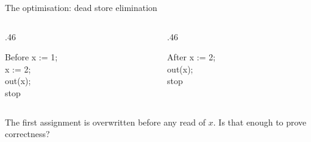 \documentclass[handout,aspectratio=169,11pt]{beamer}
\newcommand{\Takeaway}[1]{\begin{exampleblock}{}#1\end{exampleblock}}
\begin{document}
\begin{frame}{The optimisation: dead store elimination}
  \begin{columns}[T,onlytextwidth]
    \begin{column}{.46\textwidth}
      \begin{block}{Before}
        \vspace{2mm}
        \ttfamily
        x := 1;\\[2mm]
        x := 2;\\[2mm]
        out(x);\\[2mm]
        stop
        \vspace{2mm}
      \end{block}
    \end{column}
    \begin{column}{.46\textwidth}
      \begin{exampleblock}{After}
        \vspace{2mm}
        \ttfamily
        x := 2;\\[2mm]
        out(x);\\[2mm]
        stop
        \vspace{7mm}
      \end{exampleblock}
    \end{column}
  \end{columns}
  \vspace{3mm}
  \Takeaway{The first assignment is overwritten before any read of $x$. Is that enough to prove correctness?}
\end{frame}
\end{document}
